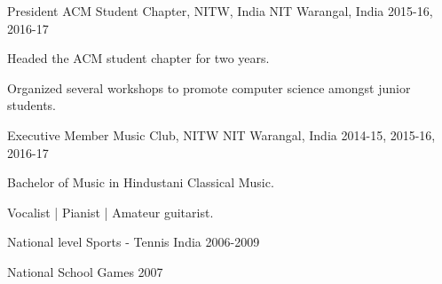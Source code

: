 

\begin{cventries}

  \cventry
    {President} %
    {ACM Student Chapter, NITW, India} %
    {NIT Warangal, India} %
    {2015-16, 2016-17} %
    {
      \begin{cvitems} %
        \item {Headed the ACM student chapter for two years.}
        \item {Organized several workshops to promote computer science amongst junior students.}
      \end{cvitems}
    }

  \cventry
    {Executive Member} %
    {Music Club, NITW} %
    {NIT Warangal, India} %
    {2014-15, 2015-16, 2016-17} %
    {
      \begin{cvitems} %
        \item {Bachelor of Music in Hindustani Classical Music.}
        \item {Vocalist | Pianist | Amateur guitarist.}
      \end{cvitems}
    }

  \cventry
    {National level} %
    {Sports - Tennis} %
    {India} %
    {2006-2009} %
    {
      \begin{cvitems} %
        \item {National School Games 2007}
      \end{cvitems}
    }
\end{cventries}
